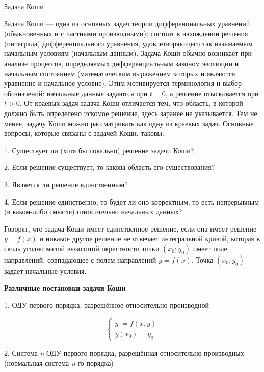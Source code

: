 \documentclass[11pt, a4paper]{article}
\begin{document}
 \begin{center} 
  {\LARGE Задача Коши} 
 \end{center}

Задача Коши — одна из основных задач теории дифференциальных уравнений (обыкновенных и с частными производными); состоит в нахождении решения (интеграла) дифференциального уравнения, удовлетворяющего так называемым начальным условиям (начальным данным).
Задача Коши обычно возникает при анализе процессов, определяемых дифференциальным законом эволюции и начальным состоянием (математическим выражением которых и являются уравнение и начальное условие). Этим мотивируется терминология и выбор обозначений: начальные данные задаются при $ t=0 $, а решение отыскивается при $t>0$.
От краевых задач задача Коши отличается тем, что область, в которой должно быть определено искомое решение, здесь заранее не указывается. Тем не менее, задачу Коши можно рассматривать как одну из краевых задач.
Основные вопросы, которые связаны с задачей Коши, таковы:
 
  1. Существует ли (хотя бы локально) решение задачи Коши?	
 
  2. Если решение существует, то какова область его существования?	
 
  3. Является ли решение единственным?	
 
  4. Если решение единственно, то будет ли оно корректным, то есть непрерывным (в каком-либо     смысле) относительно начальных данных?	
 
Говорят, что задача Коши имеет единственное решение, если она имеет решение $y=f(x)$  и никакое другое решение не отвечает интегральной кривой, которая в сколь угодно малой выколотой окрестности точки $(x_{0};y_{0})$ имеет поле направлений, совпадающее с полем направлений $y=f(x)$. Точка $(x_{0};y_{0}) $ задаёт начальные условия.

  \begin{center}
    \textbf{Различные постановки задачи Коши}
  \end{center}

  1. ОДУ первого порядка, разрешённое относительно производной	
  
$$\begin{cases}y^{'} = f(x,y)\\y(x_{0})=y_{0}\end{cases}$$	

  2. Система \textit{n} ОДУ первого порядка, разрешённая относительно производных (нормальная система \textit{n}-го порядка)	
  
\end{document}
